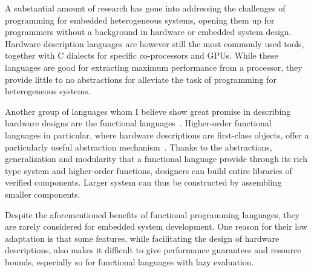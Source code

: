 \documentclass[../paper.tex]{subfiles}
\begin{document}

A substantial amount of research has gone into addressing the challenges of programming for embedded heterogeneous systems, opening them up for programmers without a background in hardware or embedded system design. Hardware description languages are however still the most commonly used tools, together with C dialects for specific co-processors and GPUs. While these languages are good for extracting maximum performance from a processor, they provide little to no abstractions for alleviate the task of programming for heterogeneous systems.


Another group of languages whom I believe show great promise in describing hardware designs are the functional languages~\cite{sheeran2005}. Higher-order functional languages in particular, where hardware descriptions are first-class objects, offer a particularly useful abstraction mechanism~\cite{baaij2010, bjesse1998, gill2010}. Thanks to the abstractions, generalization and modularity that a functional language provide through its rich type system and higher-order functions, designers can build entire libraries of verified components. Larger system can thus be constructed by assembling smaller components.


Despite the aforementioned benefits of functional programming languages, they are rarely considered for embedded system development. One reason for their low adaptation is that some features, while facilitating the design of hardware descriptions, also makes it difficult to give performance guarantees and resource bounds, especially so for functional languages with lazy evaluation.
\end{document}
